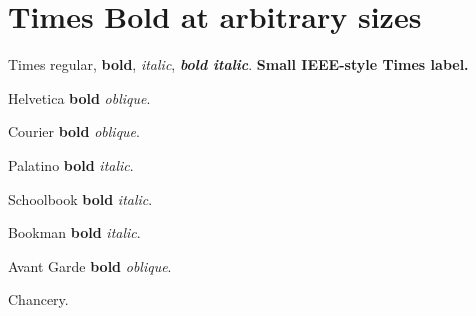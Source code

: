 \documentclass{article}
\begin{document}
\selectfont
\section{Times Bold at arbitrary sizes}
Times regular, \textbf{bold}, \textit{italic}, \textbf{\textit{bold italic}}.
{\fontsize{5.8}{7}\selectfont\bfseries Small IEEE-style Times label.}
\par{}\selectfont Helvetica \textbf{bold} \textit{oblique}.
\par{}\selectfont Courier \textbf{bold} \textit{oblique}.
\par{}\selectfont Palatino \textbf{bold} \textit{italic}.
\par{}\selectfont Schoolbook \textbf{bold} \textit{italic}.
\par{}\selectfont Bookman \textbf{bold} \textit{italic}.
\par{}\selectfont Avant Garde \textbf{bold} \textit{oblique}.
\par{}\selectfont Chancery.
\par{}\quad{}
\end{document}
